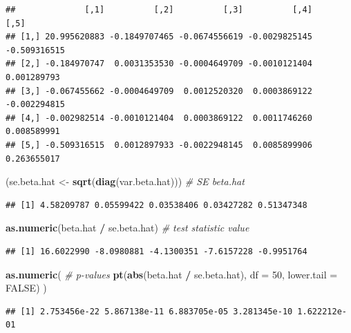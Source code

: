 \documentclass[]{article}
\newenvironment{Shaded}{\begin{snugshade}}{\end{snugshade}}
\newcommand{\CommentTok}[1]{\textcolor[rgb]{0.56,0.35,0.01}{\textit{#1}}}
\newcommand{\DataTypeTok}[1]{\textcolor[rgb]{0.13,0.29,0.53}{#1}}
\newcommand{\DecValTok}[1]{\textcolor[rgb]{0.00,0.00,0.81}{#1}}
\newcommand{\KeywordTok}[1]{\textcolor[rgb]{0.13,0.29,0.53}{\textbf{#1}}}
\newcommand{\NormalTok}[1]{#1}
\newcommand{\OperatorTok}[1]{\textcolor[rgb]{0.81,0.36,0.00}{\textbf{#1}}}
\newcommand{\OtherTok}[1]{\textcolor[rgb]{0.56,0.35,0.01}{#1}}
\newcommand{\StringTok}[1]{\textcolor[rgb]{0.31,0.60,0.02}{#1}}
\begin{document}
\begin{verbatim}
##              [,1]          [,2]          [,3]          [,4]         [,5]
## [1,] 20.995620883 -0.1849707465 -0.0674556619 -0.0029825145 -0.509316515
## [2,] -0.184970747  0.0031353530 -0.0004649709 -0.0010121404  0.001289793
## [3,] -0.067455662 -0.0004649709  0.0012520320  0.0003869122 -0.002294815
## [4,] -0.002982514 -0.0010121404  0.0003869122  0.0011746260  0.008589991
## [5,] -0.509316515  0.0012897933 -0.0022948145  0.0085899906  0.263655017
\end{verbatim}

\begin{Shaded}
\begin{Highlighting}[]
\NormalTok{(se.beta.hat <-}\StringTok{ }\KeywordTok{sqrt}\NormalTok{(}\KeywordTok{diag}\NormalTok{(var.beta.hat)))  }\CommentTok{# SE beta.hat}
\end{Highlighting}
\end{Shaded}

\begin{verbatim}
## [1] 4.58209787 0.05599422 0.03538406 0.03427282 0.51347348
\end{verbatim}

\begin{Shaded}
\begin{Highlighting}[]
\KeywordTok{as.numeric}\NormalTok{(beta.hat }\OperatorTok{/}\StringTok{ }\NormalTok{se.beta.hat)  }\CommentTok{# test statistic value}
\end{Highlighting}
\end{Shaded}

\begin{verbatim}
## [1] 16.6022990 -8.0980881 -4.1300351 -7.6157228 -0.9951764
\end{verbatim}

\begin{Shaded}
\begin{Highlighting}[]
\KeywordTok{as.numeric}\NormalTok{(  }\CommentTok{# p-values}
  \KeywordTok{pt}\NormalTok{(}\KeywordTok{abs}\NormalTok{(beta.hat }\OperatorTok{/}\StringTok{ }\NormalTok{se.beta.hat), }\DataTypeTok{df =} \DecValTok{50}\NormalTok{, }\DataTypeTok{lower.tail =} \OtherTok{FALSE}\NormalTok{)}
\NormalTok{)}
\end{Highlighting}
\end{Shaded}

\begin{verbatim}
## [1] 2.753456e-22 5.867138e-11 6.883705e-05 3.281345e-10 1.622212e-01
\end{verbatim}
\end{document}
